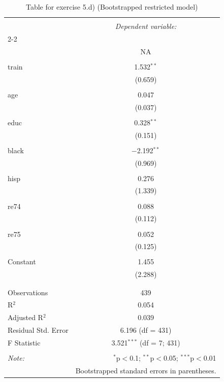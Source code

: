 
\begin{table}[!htbp] \centering 
  \caption{Table for exercise 5.d) (Bootstrapped restricted model)} 
  \label{} 
\begin{tabular}{@{\extracolsep{5pt}}lc} 
\\[-1.8ex]\hline 
\hline \\[-1.8ex] 
 & \multicolumn{1}{c}{\textit{Dependent variable:}} \\ 
\cline{2-2} 
\\[-1.8ex] & NA \\ 
\hline \\[-1.8ex] 
 train & 1.532$^{**}$ \\ 
  & (0.659) \\ 
  & \\ 
 age & 0.047 \\ 
  & (0.037) \\ 
  & \\ 
 educ & 0.328$^{**}$ \\ 
  & (0.151) \\ 
  & \\ 
 black & $-$2.192$^{**}$ \\ 
  & (0.969) \\ 
  & \\ 
 hisp & 0.276 \\ 
  & (1.339) \\ 
  & \\ 
 re74 & 0.088 \\ 
  & (0.112) \\ 
  & \\ 
 re75 & 0.052 \\ 
  & (0.125) \\ 
  & \\ 
 Constant & 1.455 \\ 
  & (2.288) \\ 
  & \\ 
\hline \\[-1.8ex] 
Observations & 439 \\ 
R$^{2}$ & 0.054 \\ 
Adjusted R$^{2}$ & 0.039 \\ 
Residual Std. Error & 6.196 (df = 431) \\ 
F Statistic & 3.521$^{***}$ (df = 7; 431) \\ 
\hline 
\hline \\[-1.8ex] 
\textit{Note:}  & \multicolumn{1}{r}{$^{*}$p$<$0.1; $^{**}$p$<$0.05; $^{***}$p$<$0.01} \\ 
 & \multicolumn{1}{r}{Bootstrapped standard errors in parentheses.} \\ 
\end{tabular} 
\end{table} 
